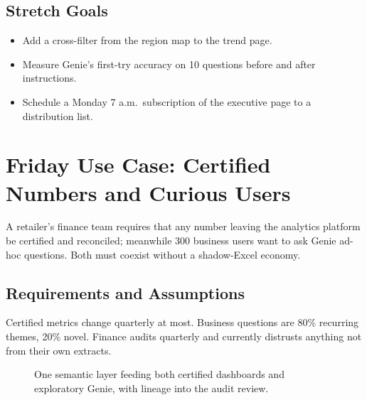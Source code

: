 \subsection*{Stretch Goals}
\begin{itemize}
    \item Add a cross-filter from the region map to the trend page.
    \item Measure Genie's first-try accuracy on 10 questions before and after instructions.
    \item Schedule a Monday 7 a.m.\ subscription of the executive page to a distribution list.
\end{itemize}

\section{Friday Use Case: Certified Numbers and Curious Users}
A retailer's finance team requires that any number leaving the analytics platform be certified and reconciled; meanwhile 300 business users want to ask Genie ad-hoc questions. Both must coexist without a shadow-Excel economy.

\subsection{Requirements and Assumptions}
Certified metrics change quarterly at most. Business questions are 80\% recurring themes, 20\% novel. Finance audits quarterly and currently distrusts anything not from their own extracts.

\begin{figure}[H]
    \centering
    \caption{One semantic layer feeding both certified dashboards and exploratory Genie, with lineage into the audit review.}
    \label{fig:ch7-selfservice}
\end{figure}

